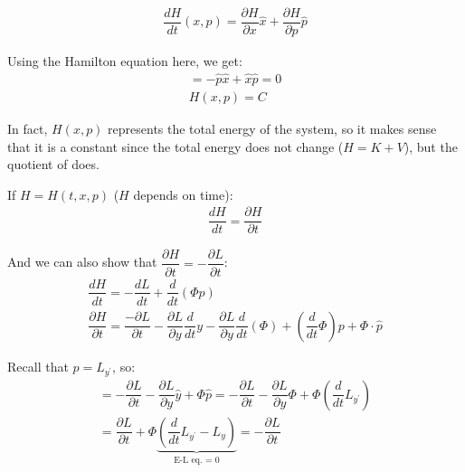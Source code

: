 \begin{equation*}
  \begin{gathered}
    \dfrac{dH}{dt}(x,p) = \dfrac{\partial H}{\partial x}\hat{x}+\dfrac{\partial H}{\partial p}\hat{p}
  \end{gathered}
\end{equation*}\par
\noindent Using the Hamilton equation here, we get:
\begin{equation*}
  \begin{gathered}
    =-\hat{p}\hat{x}+\hat{x}\hat{p} = 0\\
    H(x,p) = C
  \end{gathered}
\end{equation*}\par
\noindent In fact, $H(x,p)$ represents the total energy of the system, so it makes sense that it is a constant since the total energy does not change ($H = K+V$), but the quotient of does.
\par\bigskip
\noindent If $H = H(t,x,p)$ ($H$ depends on time):
\begin{equation*}
  \begin{gathered}
    \dfrac{dH}{dt} = \dfrac{\partial  H }{\partial t}
  \end{gathered}
\end{equation*}\par
\noindent And we can also show that $\dfrac{\partial  H}{\partial t} = -\dfrac{\partial L}{\partial t}$:
\begin{equation*}
  \begin{gathered}
    \dfrac{dH}{dt} = -\dfrac{dL}{dt}+\dfrac{d}{dt}(\Phi p)\\
    \dfrac{\partial H}{\partial t} = \dfrac{-\partial L}{\partial t}-\dfrac{\partial L}{\partial y}\dfrac{d}{dt}y-\dfrac{\partial L}{\partial y}\dfrac{d}{dt}(\Phi)+\left(\dfrac{d}{dt}\Phi\right)p+\Phi\cdot\hat{p}
  \end{gathered}
\end{equation*}\par
\noindent Recall that $p = L_{y^{\prime}}$, so:
\begin{equation*}
  \begin{gathered}
    = -\dfrac{\partial L}{\partial t}-\dfrac{\partial L}{\partial y}\hat{y}+\Phi\hat{p} = -\dfrac{\partial L}{\partial t}-\dfrac{\partial L}{\partial y}\Phi+\Phi\left(\dfrac{d}{dt}L_{y^{\prime}}\right)\\
    =\dfrac{\partial L}{\partial t}+\Phi\underbrace{\left(\dfrac{d}{dt}L_{y^{\prime}}-L_y\right)}_{\text{E-L eq. = 0}} = -\dfrac{\partial L}{\partial t}
  \end{gathered}
\end{equation*}
